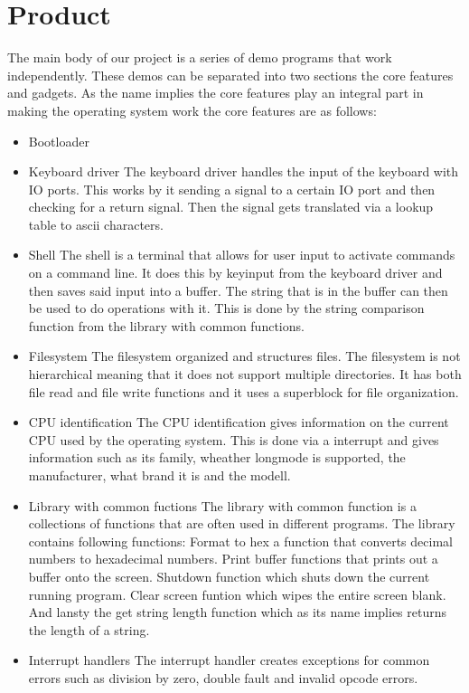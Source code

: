 \section{Product}

The main body of our project is a series of demo programs that work independently.
These demos can be separated into two sections the core features and gadgets.
As the name implies the core features play an integral part in making the operating
system work the core features are as follows:


\begin{itemize}

\item Bootloader
\item Keyboard driver
The keyboard driver handles the input of the keyboard with IO ports. This works
by it sending a signal to a certain IO port and then checking for a return signal.
Then the signal gets translated via a lookup table to ascii characters.
\item Shell
The shell is a terminal that allows for user input to activate commands on a command
line. It does this by keyinput from the keyboard driver and then saves said input
into a buffer. The string that is in the buffer can then be used to do operations with
it. This is done by the string comparison function from the library with common functions.
\item Filesystem
The filesystem organized and structures files. The filesystem is not hierarchical meaning
that it does not support multiple directories. It has both file read and file write functions
and it uses a superblock for file organization.
\item CPU identification
The CPU identification gives information on the current CPU used by the operating system.
This is done via a interrupt and gives information such as its family, wheather longmode is
supported, the manufacturer, what brand it is and the modell.
\item Library with common fuctions
The library with common function is a collections of functions that are often used in different
programs. The library contains following functions: Format to hex a function that converts decimal
numbers to hexadecimal numbers. Print buffer functions that prints out a buffer onto the screen. 
Shutdown function which shuts down the current running program. Clear screen funtion which wipes
the entire screen blank. And lansty the get string length function which as its name implies returns
the length of a string.
\item Interrupt handlers
The interrupt handler creates exceptions for common errors such as division by zero, double fault
and invalid opcode errors.


\end{itemize}
